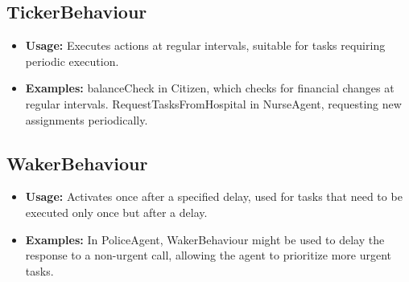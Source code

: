 \documentclass[conference]{IEEEtran}
\begin{document}
\subsection{TickerBehaviour}
\begin{itemize}
\item \textbf{Usage:} Executes actions at regular intervals, suitable for tasks requiring periodic execution.
\item \textbf{Examples:}
balanceCheck in Citizen, which checks for financial changes at regular intervals.
RequestTasksFromHospital in NurseAgent, requesting new assignments periodically.
\end{itemize}

\subsection{WakerBehaviour}
\begin{itemize}
\item \textbf{Usage:} Activates once after a specified delay, used for tasks that need to be executed only once but after a delay.
\item \textbf{Examples:}
In PoliceAgent, WakerBehaviour might be used to delay the response to a non-urgent call, allowing the agent to prioritize more urgent tasks.
\end{itemize}

  
\end{document}
